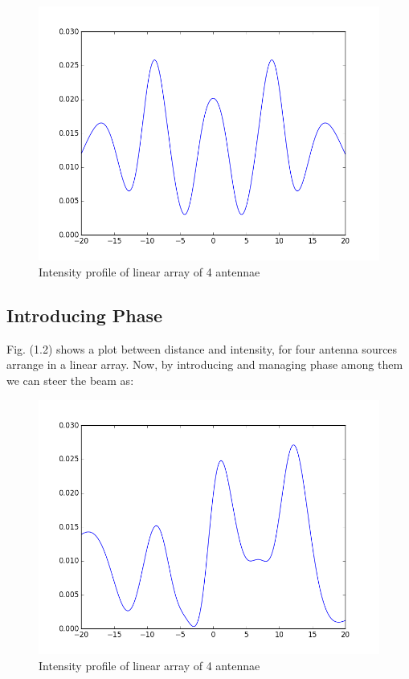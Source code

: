\begin{figure}[!h]
	\centering	
    \includegraphics[scale=0.45]{figure_2.png}
	\caption{Intensity profile of linear array of 4 antennae}
\end{figure}

\subsection{Introducing Phase}

Fig. (1.2) shows a plot between distance and intensity, for four antenna sources arrange in a linear array. Now, by introducing and managing phase among them we can steer the beam as:

\begin{figure}[!h]
	\centering	
	\includegraphics[scale=0.45]{figure_3.png}
	\caption{Intensity profile of linear array of 4 antennae}
\end{figure}

